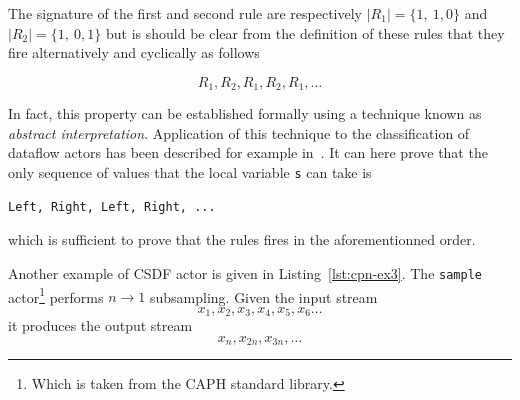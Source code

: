 The signature of the first and second rule are respectively $|R_1|=\{1,\ 1,0\}$ and
$|R_2|=\{1,\ 0,1\}$ but is should be clear from the definition of these rules that they fire
alternatively and cyclically as follows

\begin{equation*}
  R_1, R_2, R_1, R_2, R_1, \ldots
\end{equation*}

In fact, this property can be established formally
using a technique known as \emph{abstract interpretation}. Application of this technique to the
classification of dataflow actors has been described for example in~\cite{Wipliez2012}. It can here
prove that the only sequence of values that the local variable \verb|s| can take is

\begin{center}
\begin{verbatim}
Left, Right, Left, Right, ...
\end{verbatim}
\end{center}

\noindent
which is sufficient to prove that the rules fires in the aforementionned order.


\medskip
Another example of CSDF actor is given in Listing~\ref{lst:cpn-ex3}. The \verb|sample|
actor\footnote{Which is taken from the CAPH standard library.} performs $n \rightarrow 1$
subsampling. Given the input stream
\begin{equation*}
x_1, x_2, x_3, x_4, x_5, x_6 \ldots  
\end{equation*}
it produces the output stream
\begin{equation*}
x_n, x_{2n}, x_{3n}, \ldots  
\end{equation*}

